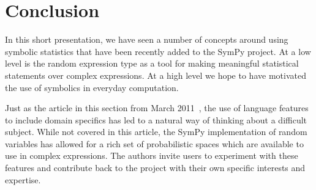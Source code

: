 \section{Conclusion}

In this short presentation, we have seen a number of concepts around using
symbolic statistics that have been recently added to the SymPy project.  At a
low level is the random expression type as a tool for making meaningful
statistical statements over complex expressions. At a high level we hope to
have motivated the use of symbolics in everyday computation.

Just as the article in this section from March
2011~\cite{Terrel2011}, the use of language features to include domain
specifics has led to a natural way of thinking about a difficult subject.
While not covered in this article, the SymPy implementation of random variables
has allowed for a rich set of probabilistic spaces which are available to use
in complex expressions.  The authors invite users to experiment with these
features and contribute back to the project with their own specific interests
and expertise.
